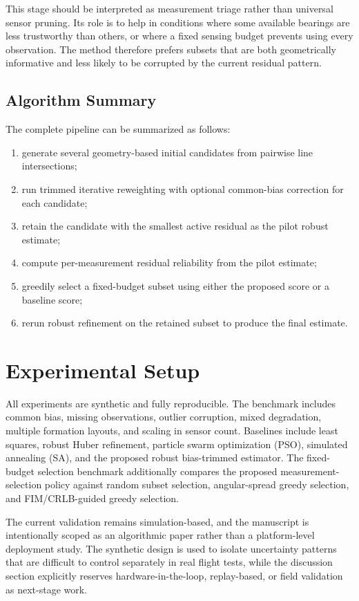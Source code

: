 \documentclass[preprint,12pt]{elsarticle}
\begin{document}
This stage should be interpreted as measurement triage rather than universal sensor pruning. Its role is to help in conditions where some available bearings are less trustworthy than others, or where a fixed sensing budget prevents using every observation. The method therefore prefers subsets that are both geometrically informative and less likely to be corrupted by the current residual pattern.

\subsection{Algorithm Summary}

The complete pipeline can be summarized as follows:
\begin{enumerate}
\item generate several geometry-based initial candidates from pairwise line intersections;
\item run trimmed iterative reweighting with optional common-bias correction for each candidate;
\item retain the candidate with the smallest active residual as the pilot robust estimate;
\item compute per-measurement residual reliability from the pilot estimate;
\item greedily select a fixed-budget subset using either the proposed score or a baseline score;
\item rerun robust refinement on the retained subset to produce the final estimate.
\end{enumerate}

\section{Experimental Setup}

All experiments are synthetic and fully reproducible. The benchmark includes common bias, missing observations, outlier corruption, mixed degradation, multiple formation layouts, and scaling in sensor count. Baselines include least squares, robust Huber refinement, particle swarm optimization (PSO), simulated annealing (SA), and the proposed robust bias-trimmed estimator. The fixed-budget selection benchmark additionally compares the proposed measurement-selection policy against random subset selection, angular-spread greedy selection, and FIM/CRLB-guided greedy selection.

The current validation remains simulation-based, and the manuscript is intentionally scoped as an algorithmic paper rather than a platform-level deployment study. The synthetic design is used to isolate uncertainty patterns that are difficult to control separately in real flight tests, while the discussion section explicitly reserves hardware-in-the-loop, replay-based, or field validation as next-stage work.
\end{document}
